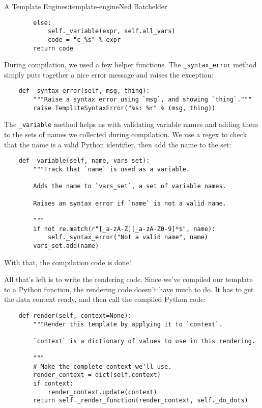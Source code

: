 \begin{aosachapter}{A Template Engine}{s:template-engine}{Ned Batchelder}
\begin{verbatim}
        else:
            self._variable(expr, self.all_vars)
            code = "c_%s" % expr
        return code
\end{verbatim}

\label{helper-functions}

During compilation, we used a few helper functions. The
\texttt{\_syntax\_error} method simply puts together a nice error
message and raises the exception:

\begin{verbatim}
    def _syntax_error(self, msg, thing):
        """Raise a syntax error using `msg`, and showing `thing`."""
        raise TempliteSyntaxError("%s: %r" % (msg, thing))
\end{verbatim}

The \texttt{\_variable} method helps us with validating variable names
and adding them to the sets of names we collected during compilation. We
use a regex to check that the name is a valid Python identifier, then
add the name to the set:

\begin{verbatim}
    def _variable(self, name, vars_set):
        """Track that `name` is used as a variable.

        Adds the name to `vars_set`, a set of variable names.

        Raises an syntax error if `name` is not a valid name.

        """
        if not re.match(r"[_a-zA-Z][_a-zA-Z0-9]*$", name):
            self._syntax_error("Not a valid name", name)
        vars_set.add(name)
\end{verbatim}

With that, the compilation code is done!

\label{rendering}

All that's left is to write the rendering code. Since we've compiled our
template to a Python function, the rendering code doesn't have much to
do. It has to get the data context ready, and then call the compiled
Python code:

\begin{verbatim}
    def render(self, context=None):
        """Render this template by applying it to `context`.

        `context` is a dictionary of values to use in this rendering.

        """
        # Make the complete context we'll use.
        render_context = dict(self.context)
        if context:
            render_context.update(context)
        return self._render_function(render_context, self._do_dots)
\end{verbatim}


\end{aosachapter}
